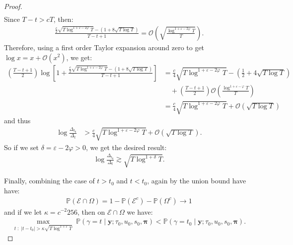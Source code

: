\begin{proof}
\begin{align*}
\end{align*}
Since $T-t > cT$, then: 
\begin{align*}
    \frac{\frac{c}{2}\sqrt{T \log^{1 +\varepsilon-2\varphi} T} - (1 + 8\sqrt{T \log T})}{T-t+1} = \mathcal{O}\left(\sqrt{\frac{\log^{1 + \varepsilon-2\varphi} T}{T}}\right).
\end{align*}
Therefore, using a first order Taylor expansion around zero to get $\log x = x + \mathcal{O}(x^2)$, we get:
\begin{align*}
     \left(\frac{T - t + 1}{2}\right) \log\left[1 + \frac{\frac{c}{2}\sqrt{T \log^{1 +\varepsilon-2\varphi} T} - (1 + 8\sqrt{T \log T})}{T-t+1}\right] &= \frac{c}{4}\sqrt{T \log^{1 +\varepsilon-2\varphi} T} - \left(\frac{1}{2} + 4\sqrt{T \log T}\right)\\
     & \quad + \left(\frac{T - t + 1}{2}\right)\mathcal{O}\left(\frac{\log^{1 + \varepsilon-\varphi} T}{T}\right) \\
     &= \frac{c}{4}\sqrt{T \log^{1 +\varepsilon-2\varphi} T} + \mathcal{O}(\sqrt{T \log T})
\end{align*}
and thus 
\begin{align*}
    \log \frac{\Delta_{t_0}}{\Delta_t} &> \frac{c}{4}\sqrt{T \log^{1 +\varepsilon-2\varphi} T} + \mathcal{O}(\sqrt{T \log T}).
\end{align*}
So if we set $\delta = \varepsilon - 2\varphi > 0$, we get the desired result:
\begin{align*}
    \log \frac{\Delta_{t_0}}{\Delta_t} \gtrsim \sqrt{T\log^{1+\delta} T}.
\end{align*}

Finally, combining the case of $t > t_0$ and $t < t_0$, again by the union bound have have:
\begin{align*}
    \mathbb{P}(\mathcal{E} \cap \Omega) = 1 - \mathbb{P}(\mathcal{E}^c) -\mathbb{P}(\Omega^c) \to 1
\end{align*}
and if we let $\kappa = c^{-2}256$, then on $\mathcal{E} \cap \Omega$ we have:
\begin{align*}
    \max_{t \;:\; |t - t_0| > \kappa \sqrt{T\log^{1+\varepsilon} T}} \; \mathbb{P}(\gamma = t  \;|\; \mathbf{y} ; \tau_0, u_0, s_0,\pmb{\pi}) < \mathbb{P}(\gamma = t_0  \;|\; \mathbf{y} ; \tau_0, u_0, s_0,\pmb{\pi}).
\end{align*}

\end{proof}